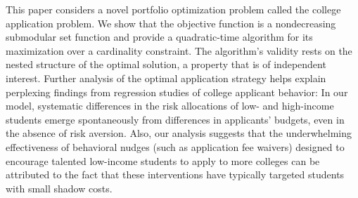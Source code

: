 This paper considers a novel portfolio optimization problem called the college application problem. We show that the objective function is a nondecreasing submodular set function and provide a quadratic-time algorithm for its maximization over a cardinality constraint. The algorithm's validity rests on the nested structure of the optimal solution, a property that is of independent interest. Further analysis of the optimal application strategy helps explain perplexing findings from regression studies of college applicant behavior: In our model, systematic differences in the risk allocations of low- and high-income students emerge spontaneously from differences in applicants' budgets, even in the absence of risk aversion. Also, our analysis suggests that the underwhelming effectiveness of behavioral nudges (such as application fee waivers) designed to encourage talented low-income students to apply to more colleges can be attributed to the fact that these interventions have typically targeted students with small shadow costs.
